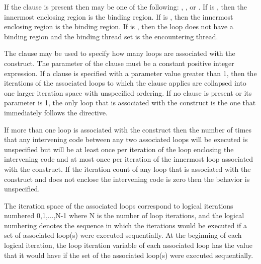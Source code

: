 If the  clause is present then  may be one of
the following: , , or . If
 is , then the innermost enclosing
 region is the binding region.  If  is
, then the innermost enclosing  region is the
binding region. If  is , then the loop does not have
a binding region and the binding thread set is the encountering thread.


The  clause may be used to specify how many loops are associated
with the  construct. The parameter of the  clause
must be a constant positive integer expression. If a  clause is
specified with a parameter value greater than 1, then the iterations of the
associated loops to which the clause applies are collapsed into one larger
iteration space with unspecified ordering. If no  clause is
present or its parameter is 1, the only loop that is associated with the
 construct is the one that immediately follows the 
directive.

If more than one loop is associated with the  construct then the
number of times that any intervening code between any two associated
loops will be executed is unspecified but will be at least once per
iteration of the loop enclosing the intervening code and at most once
per iteration of the innermost loop associated with the construct. If the
iteration count of any loop that is associated with the  construct and does not
enclose the intervening code is zero then the behavior is unspecified.

The iteration space of the associated loops correspond to logical
iterations numbered 0,1,...,N-1 where N is the number of loop iterations, and
the logical numbering denotes the sequence in which the iterations would be
executed if a set of associated loop(s) were executed sequentially.  At the
beginning of each logical iteration, the loop iteration variable of each
associated loop has the value that it would have if the set of the associated
loop(s) were executed sequentially. 


